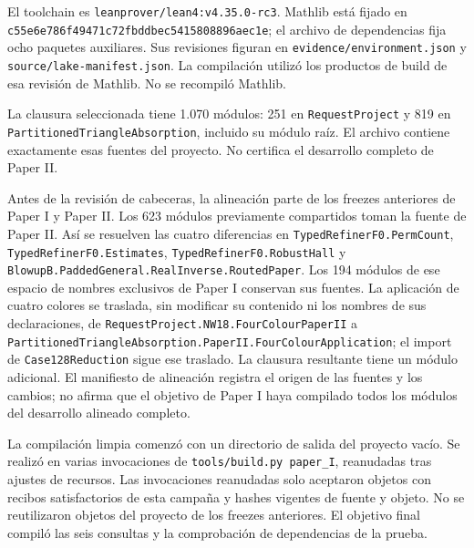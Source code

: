 \documentclass[spanish,11pt,a4paper]{article}
\begin{document}
El toolchain es \texttt{leanprover/\allowbreak{}lean4:v4.\allowbreak{}35.\allowbreak{}0-rc3}. Mathlib está fijado en \texttt{c55e6e78\allowbreak{}6f49471c\allowbreak{}72fbddbe\allowbreak{}c5415808\allowbreak{}896aec1e}; el archivo de dependencias fija ocho paquetes auxiliares. Sus revisiones figuran en \texttt{evidence/\allowbreak{}environment.\allowbreak{}json} y \texttt{source/\allowbreak{}lake-manifest.\allowbreak{}json}. La compilación utilizó los productos de build de esa revisión de Mathlib. No se recompiló Mathlib.

La clausura seleccionada tiene 1.070 módulos: 251 en \texttt{Request\allowbreak{}Project} y 819 en \texttt{Partitioned\allowbreak{}Triangle\allowbreak{}Absorption}, incluido su módulo raíz. El archivo contiene exactamente esas fuentes del proyecto. No certifica el desarrollo completo de Paper II.

Antes de la revisión de cabeceras, la alineación parte de los freezes anteriores de Paper I y Paper II. Los 623 módulos previamente compartidos toman la fuente de Paper II. Así se resuelven las cuatro diferencias en \texttt{Typed\allowbreak{}Refiner\allowbreak{}F0.\allowbreak{}Perm\allowbreak{}Count}, \texttt{Typed\allowbreak{}Refiner\allowbreak{}F0.\allowbreak{}Estimates}, \texttt{Typed\allowbreak{}Refiner\allowbreak{}F0.\allowbreak{}Robust\allowbreak{}Hall} y \texttt{Blowup\allowbreak{}B.\allowbreak{}Padded\allowbreak{}General.\allowbreak{}Real\allowbreak{}Inverse.\allowbreak{}Routed\allowbreak{}Paper}. Los 194 módulos de ese espacio de nombres exclusivos de Paper I conservan sus fuentes. La aplicación de cuatro colores se traslada, sin modificar su contenido ni los nombres de sus declaraciones, de \texttt{Request\allowbreak{}Project.\allowbreak{}NW18.\allowbreak{}Four\allowbreak{}Colour\allowbreak{}Paper\allowbreak{}II} a \texttt{Partitioned\allowbreak{}Triangle\allowbreak{}Absorption.\allowbreak{}Paper\allowbreak{}II.\allowbreak{}Four\allowbreak{}Colour\allowbreak{}Application}; el import de \texttt{Case128Reduction} sigue ese traslado. La clausura resultante tiene un módulo adicional. El manifiesto de alineación registra el origen de las fuentes y los cambios; no afirma que el objetivo de Paper I haya compilado todos los módulos del desarrollo alineado completo.

La compilación limpia comenzó con un directorio de salida del proyecto vacío. Se realizó en varias invocaciones de \texttt{tools/\allowbreak{}build.\allowbreak{}py\ paper\_\allowbreak{}I}, reanudadas tras ajustes de recursos. Las invocaciones reanudadas solo aceptaron objetos con recibos satisfactorios de esta campaña y hashes vigentes de fuente y objeto. No se reutilizaron objetos del proyecto de los freezes anteriores. El objetivo final compiló las seis consultas y la comprobación de dependencias de la prueba.
\end{document}
